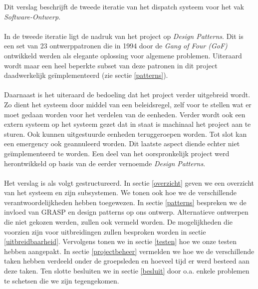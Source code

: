 Dit verslag beschrijft de tweede iteratie van het dispatch systeem voor het vak \textit{Software-Ontwerp}.
\paragraph{}
In de tweede iteratie ligt de nadruk van het project op \textit{Design Patterns}. Dit is een set van 23 ontwerppatronen die in 1994 door de \textit{Gang of Four (GoF)} ontwikkeld werden als elegante oplossing voor algemene problemen. Uiteraard wordt maar een heel beperkte subset van deze patronen in dit project daadwerkelijk ge\"implementeerd (zie sectie \ref{patterns}).
\paragraph{}
Daarnaast is het uiteraard de bedoeling dat het project verder uitgebreid wordt. Zo dient het systeem door middel van een beleidsregel, zelf voor te stellen wat er moet gedaan worden voor het verdelen van de eenheden. Verder wordt ook een extern systeem op het systeem gezet dat in staat is machinaal het project aan te sturen. Ook kunnen uitgestuurde eenheden teruggeroepen worden. Tot slot kan een emergency ook geannuleerd worden. Dit laatste aspect diende echter niet ge\"implementeerd te worden.
Een deel van het oorspronkelijk project werd herontwikkeld op basis van de eerder vernoemde \textit{Design Patterns}.
\paragraph{}
Het verslag is als volgt gestructureerd. In sectie \ref{overzicht} geven we een overzicht van het systeem en zijn subsystemen.
We tonen ook hoe we de verschillende verantwoordelijkheden hebben toegewezen.
In sectie \ref{patterns} bespreken we de invloed van GRASP en design patterns op ons ontwerp.
Alternatieve ontwerpen die niet gekozen werden, zullen ook vermeld worden.
De mogelijkheden die voorzien zijn voor uitbreidingen zullen besproken worden in sectie \ref{uitbreidbaarheid}.
Vervolgens tonen we in sectie \ref{testen} hoe we onze testen hebben aangepakt.
In sectie \ref{projectbeheer} vermelden we hoe we de verschillende taken hebben verdeeld onder de groepsleden
en hoeveel tijd er werd besteed aan deze taken.
Ten slotte besluiten we in sectie \ref{besluit} door o.a. enkele problemen te schetsen die we zijn tegengekomen.
